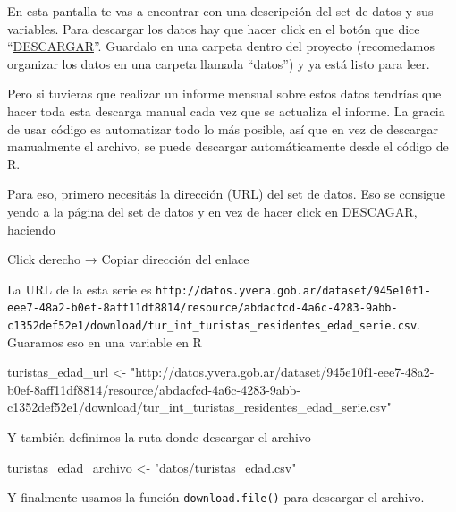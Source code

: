 \documentclass[
  openany]{book}
\newenvironment{Shaded}{\begin{snugshade}}{\end{snugshade}}
\newcommand{\NormalTok}[1]{#1}
\newcommand{\OtherTok}[1]{\textcolor[rgb]{0.56,0.35,0.01}{#1}}
\newcommand{\StringTok}[1]{\textcolor[rgb]{0.31,0.60,0.02}{#1}}
\begin{document}
En esta pantalla te vas a encontrar con una descripción del set de datos y sus variables.
Para descargar los datos hay que hacer click en el botón que dice ``\href{http://datos.yvera.gob.ar/dataset/945e10f1-eee7-48a2-b0ef-8aff11df8814/resource/abdacfcd-4a6c-4283-9abb-c1352def52e1/download/tur_int_turistas_residentes_edad_serie.csv}{DESCARGAR}''.
Guardalo en una carpeta dentro del proyecto (recomedamos organizar los datos en una carpeta llamada ``datos'') y ya está listo para leer.

Pero si tuvieras que realizar un informe mensual sobre estos datos tendrías que hacer toda esta descarga manual cada vez que se actualiza el informe.
La gracia de usar código es automatizar todo lo más posible, así que en vez de descargar manualmente el archivo, se puede descargar automáticamente desde el código de R.

Para eso, primero necesitás la dirección (URL) del set de datos.
Eso se consigue yendo a \href{http://datos.yvera.gob.ar/dataset/encuesta-viajes-turismo-hogares-evyth/archivo/abdacfcd-4a6c-4283-9abb-c1352def52e1}{la página del set de datos} y en vez de hacer click en DESCAGAR, haciendo

Click derecho → Copiar dirección del enlace

La URL de la esta serie es \texttt{http://datos.yvera.gob.ar/dataset/945e10f1-eee7-48a2-b0ef-8aff11df8814/resource/abdacfcd-4a6c-4283-9abb-c1352def52e1/download/tur\_int\_turistas\_residentes\_edad\_serie.csv}.
Guaramos eso en una variable en R

\begin{Shaded}
\begin{Highlighting}[]
\NormalTok{turistas\_edad\_url }\OtherTok{\textless{}{-}} \StringTok{"http://datos.yvera.gob.ar/dataset/945e10f1{-}eee7{-}48a2{-}b0ef{-}8aff11df8814/resource/abdacfcd{-}4a6c{-}4283{-}9abb{-}c1352def52e1/download/tur\_int\_turistas\_residentes\_edad\_serie.csv"}
\end{Highlighting}
\end{Shaded}

Y también definimos la ruta donde descargar el archivo

\begin{Shaded}
\begin{Highlighting}[]
\NormalTok{turistas\_edad\_archivo }\OtherTok{\textless{}{-}} \StringTok{"datos/turistas\_edad.csv"}
\end{Highlighting}
\end{Shaded}

Y finalmente usamos la función \texttt{download.file()} para descargar el archivo.
\end{document}

